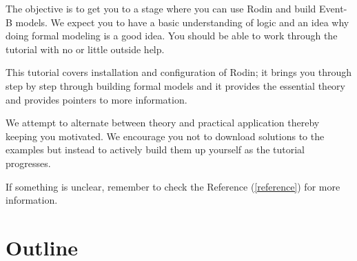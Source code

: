 
The objective is to get you to a stage where you can use Rodin and build Event-B models.  We expect you to have a basic understanding of logic and an idea why doing formal modeling is a good idea.  You should be able to work through the tutorial with no or little outside help.

This tutorial covers installation and configuration of Rodin; it brings you through step by step through building formal models and it provides the essential theory and provides pointers to more information.

We attempt to alternate between theory and practical application thereby keeping you motivated.  We encourage you not to download solutions to the examples but instead to actively build them up yourself as the tutorial progresses.

If something is unclear, remember to check the Reference (\ref{reference}) for more information.

\section{Outline}

